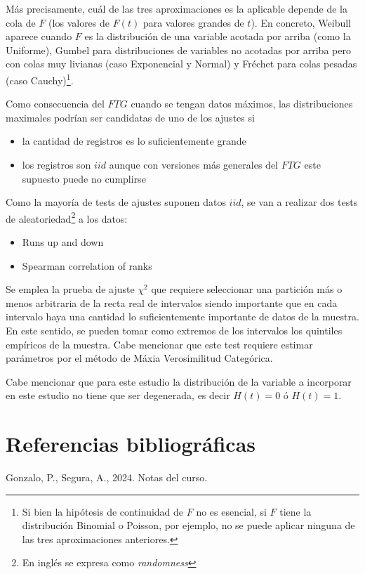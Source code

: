 \documentclass[
  12pt]{article}
\newlength{\cslhangindent}
\newlength{\cslentryspacingunit} %
\newenvironment{CSLReferences}[2] %
 {%
  \setlength{\parindent}{0pt}
  \ifodd #1
  \let\oldpar\par
  \def\par{\hangindent=\cslhangindent\oldpar}
  \fi
  \setlength{\parskip}{#2\cslentryspacingunit}
 }%
 {}
\begin{document}
Más precisamente, cuál de las tres aproximaciones es la aplicable
depende de la cola de \(F\) (los valores de \(F(t)\) para valores
grandes de \(t\)). En concreto, Weibull aparece cuando \(F\) es la
distribución de una variable acotada por arriba (como la Uniforme),
Gumbel para distribuciones de variables no acotadas por arriba pero con
colas muy livianas (caso Exponencial y Normal) y Fréchet para colas
pesadas (caso
Cauchy)\footnote{Si bien  la hipótesis de continuidad de $F$ no es esencial, si $F$ tiene
la distribución Binomial o Poisson, por ejemplo, no se puede aplicar ninguna de las tres aproximaciones anteriores.}.

Como consecuencia del \(FTG\) cuando se tengan datos máximos, las
distribuciones maximales podrían ser candidatas de uno de los ajustes si

\begin{itemize}
\item la cantidad de registros es lo suficientemente grande
\item los registros son $iid$ aunque con versiones más generales del $FTG$ este supuesto puede no cumplirse
\end{itemize}

Como la mayoría de tests de ajustes suponen datos \(iid\), se van a
realizar dos tests de
aleatoriedad\footnote{En inglés se expresa como \textit{randomness}} a
los datos:

\begin{itemize}
\item  Runs up and down 
\item  Spearman correlation of ranks 
\end{itemize}

Se emplea la prueba de ajuste \(\chi^2\) que requiere seleccionar una
partición más o menos arbitraria de la recta real de intervalos siendo
importante que en cada intervalo haya una cantidad lo suficientemente
importante de datos de la muestra. En este sentido, se pueden tomar como
extremos de los intervalos los quintiles empíricos de la muestra. Cabe
mencionar que este test requiere estimar parámetros por el método de
Máxia Verosimilitud Categórica.

Cabe mencionar que para este estudio la distribución de la variable a
incorporar en este estudio no tiene que ser degenerada, es decir
\(H(t)=0\) ó \(H(t)=1\).

\newpage

\hypertarget{referencias-bibliogruxe1ficas}{%
\section{Referencias
bibliográficas}\label{referencias-bibliogruxe1ficas}}

\vspace{1cm}
\setlength{\parindent}{-0.2in}
\setlength{\leftskip}{0.2in}

\hypertarget{refs}{}
\begin{CSLReferences}{1}{0}
\leavevmode{}%
Gonzalo, P., Segura, A., 2024. Notas del curso.

\end{CSLReferences}
\end{document}
